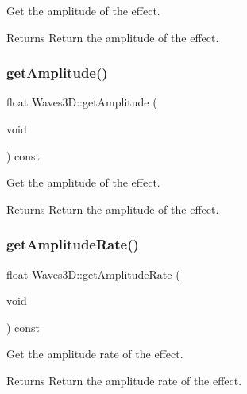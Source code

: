 Get the amplitude of the effect. 

\begin{DoxyReturn}{Returns}
Return the amplitude of the effect. 
\end{DoxyReturn}
\mbox{\label{classWaves3D_a39b277cd8949ec1862b297d84140c75c}} 
\subsubsection{\texorpdfstring{get\+Amplitude()}{getAmplitude()}\hspace{0.1cm}{\footnotesize\ttfamily [2/2]}}
{\footnotesize\ttfamily float Waves3\+D\+::get\+Amplitude (\begin{DoxyParamCaption}\item[{void}]{ }\end{DoxyParamCaption}) const\hspace{0.3cm}{\ttfamily [inline]}}



Get the amplitude of the effect. 

\begin{DoxyReturn}{Returns}
Return the amplitude of the effect. 
\end{DoxyReturn}
\mbox{\label{classWaves3D_a1695dd124fd56fe1ec1c7102d26db794}} 
\subsubsection{\texorpdfstring{get\+Amplitude\+Rate()}{getAmplitudeRate()}\hspace{0.1cm}{\footnotesize\ttfamily [1/2]}}
{\footnotesize\ttfamily float Waves3\+D\+::get\+Amplitude\+Rate (\begin{DoxyParamCaption}\item[{void}]{ }\end{DoxyParamCaption}) const\hspace{0.3cm}{\ttfamily [inline]}}



Get the amplitude rate of the effect. 

\begin{DoxyReturn}{Returns}
Return the amplitude rate of the effect. 
\end{DoxyReturn}
\mbox{\label{classWaves3D_a1695dd124fd56fe1ec1c7102d26db794}} 
